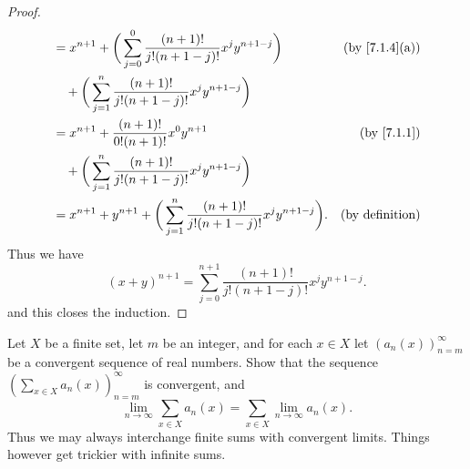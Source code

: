 \begin{proof}
\begin{align*}
     & = x^{n + 1} + \bigg(\sum_{j = 0}^0 \frac{(n + 1)!}{j!(n + 1 - j)!} x^j y^{n + 1 - j}\bigg)                                  & \text{(by \cref{7.1.4}(a))} \\
     & \quad + \bigg(\sum_{j = 1}^n \frac{(n + 1)!}{j!(n + 1 - j)!} x^j y^{n + 1 - j}\bigg)                                                                      \\
     & = x^{n + 1} + \frac{(n + 1)!}{0! (n + 1)!} x^0 y^{n + 1}                                                                    & \text{(by \cref{7.1.1})}    \\
     & \quad + \bigg(\sum_{j = 1}^n \frac{(n + 1)!}{j!(n + 1 - j)!} x^j y^{n + 1 - j}\bigg)                                                                      \\
     & = x^{n + 1} + y^{n + 1} + \bigg(\sum_{j = 1}^n \frac{(n + 1)!}{j!(n + 1 - j)!} x^j y^{n + 1 - j}\bigg).                     & \text{(by definition)}
  \end{align*}
  Thus we have
  \[
    (x + y)^{n + 1} = \sum_{j = 0}^{n + 1} \frac{(n + 1)!}{j!(n + 1 - j)!} x^j y^{n + 1 - j}.
  \]
  and this closes the induction.
\end{proof}

\begin{exercise}\label{ex 7.1.5}
  Let \(X\) be a finite set, let \(m\) be an integer, and for each \(x \in X\) let \((a_n(x))_{n = m}^\infty\) be a convergent sequence of real numbers.
  Show that the sequence \((\sum_{x \in X} a_n(x))_{n = m}^\infty\) is convergent, and
  \[
    \lim_{n \to \infty} \sum_{x \in X} a_n(x) = \sum_{x \in X} \lim_{n \to \infty} a_n(x).
  \]
  Thus we may always interchange finite sums with convergent limits.
  Things however get trickier with infinite sums.
\end{exercise}

